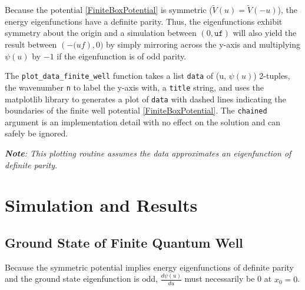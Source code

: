 \documentclass{article}
\begin{document}
Because the potential \eqref{FiniteBoxPotential} is symmetric
($\widetilde{V}(u) = \widetilde{V}(-u)$), the energy eigenfunctions have a
definite parity. Thus, the eigenfunctions exhibit symmetry about the origin and 
a simulation between $(0, \texttt{uf})$ will also yield the result between
$(-\texttt(uf), 0)$ by simply mirroring across the y-axis and multiplying
$\psi(u)$ by $-1$ if the eigenfunction is of odd parity.

The \texttt{plot\_data\_finite\_well} function takes a list \texttt{data} of
(u, $\psi(u)$) 2-tuples, the wavenumber \texttt{n} to label the y-axis with,
a \texttt{title} string, and uses the matplotlib library to generates a plot of
\texttt{data} with dashed lines indicating the boundaries of the finite well
potential \eqref{FiniteBoxPotential}. The \texttt{chained} argument is an implementation
detail with no effect on the solution and can safely be ignored.

\emph{\textbf{Note}: This plotting routine assumes the data approximates an
eigenfunction of definite parity.}

\section{Simulation and Results}
\subsection{Ground State of Finite Quantum Well} Because the symmetric
potential implies energy eigenfunctions of definite parity and the ground state
eigenfunction is odd, $\frac{d\psi(u)}{du}$ must necessarily be 0 at $x_0 = 0$. 
\end{document}

